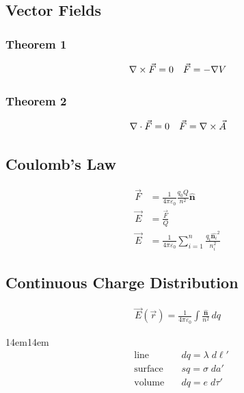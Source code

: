 \documentclass[10pt,oneside]{book}
\begin{document}
\subsection*{Vector Fields}
\subsubsection*{Theorem 1}
\[\nabla \times \vec F = 0\quad \vec F = -\nabla V\]
\subsubsection*{Theorem 2}
\[\nabla\cdot\vec F = 0\quad\vec F = \nabla\times\vec A\]

\subsection*{Coulomb's Law}
\begin{align*}
  \vec F &= \frac{1}{4\pi\varepsilon_0}\frac{q_0 Q}{n^2}\hat{\mathbf n}\\
  \vec E &= \frac{\vec F}{Q}\\
  \vec E &=\frac{1}{4\pi \varepsilon_0}\sum_{i=1}^{n}\frac{q_i\hat {\mathbf{n}_i}^2}{n_i^2}
\end{align*}
\subsection*{Continuous Charge Distribution}
\begin{align*}
  \vec E (\vec r) = \frac{1}{4\pi\varepsilon_0}\int\frac{\hat{\mathbf{n}}}{n^2}\,dq
\end{align*}
\begin{adjustwidth}{14em}{14em}
  \begin{align*}
    &\text{line}\quad &dq = \lambda \;d\ell '\\
    &\text{surface}\quad &sq = \sigma \;da'\\
    &\text{volume}\quad &dq = e\;d\tau'
  \end{align*}
\end{adjustwidth}
\end{document}
